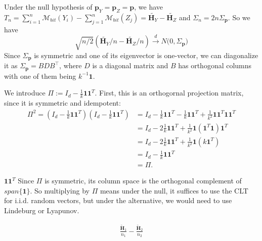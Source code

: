 \documentclass[11pt]{article} %
\begin{document}
Under the null hypothesis of $\boldsymbol{p}_Y = \boldsymbol{p}_Z = \boldsymbol{p}$, 
we have
$T_n = \sum_{i=1}^n\mathcal{M}_{bit}(Y_i) - \sum_{j=1}^n \mathcal{M}_{bit}(Z_j)= \tilde{\boldsymbol{H}_Y} - \tilde{\boldsymbol{H}_Z} $ and 
$\Sigma_n = 2n \Sigma_{\boldsymbol{p}}$.
So we have
\begin{equation}
	\sqrt{n/2}(\tilde{\boldsymbol{H}_Y}/n -\tilde{\boldsymbol{H}_Z}/n)
	\stackrel{d}{\to}
	N
	\bigl(
	0, \Sigma_{\boldsymbol{p}}
	\bigr)
\end{equation}
Since $\Sigma_{\boldsymbol{p}}$ is symmetric and one of its eigenvector is one-vector, we can diagonalize it as  $\Sigma_{\boldsymbol{p}} = BDB^\top$, where $D$ is a diagonal matrix and $B$ has orthogonal columns with one of them being $k^{-1} \boldsymbol{1}$.

We introduce $\Pi := I_d - \frac{1}{k}\boldsymbol{1} \boldsymbol{1}^T$.
First, this is an orthogornal projection matrix, since it is symmetric and idempotent:
\begin{align*}
\Pi^2 =
\left(
I_d - \frac{1}{k}\boldsymbol{1} \boldsymbol{1}^T
\right)
\left(
I_d - \frac{1}{k}\boldsymbol{1} \boldsymbol{1}^T
\right)
&=
I_d -  \frac{1}{k}\boldsymbol{1} \boldsymbol{1}^T
 -  \frac{1}{k}\boldsymbol{1} \boldsymbol{1}^T
 +
 \frac{1}{k^2}\boldsymbol{1} \boldsymbol{1}^T\boldsymbol{1} \boldsymbol{1}^T
\\&=
I_d -  2\frac{1}{k}\boldsymbol{1} \boldsymbol{1}^T
+
\frac{1}{k^2}\boldsymbol{1} (\boldsymbol{1}^T\boldsymbol{1}) \boldsymbol{1}^T
\\&=
I_d -  2\frac{1}{k}\boldsymbol{1} \boldsymbol{1}^T
+
\frac{1}{k^2}\boldsymbol{1} (k \boldsymbol{1}^T)
\\&=
I_d -  \frac{1}{k}\boldsymbol{1} \boldsymbol{1}^T
\\&= \Pi.
\end{align*}

$\boldsymbol{1} \boldsymbol{1}^T$
Since $\Pi$ is symmetric, its column space is the orthogonal complement of $span\{\boldsymbol{1}\}$.
So multiplying by $\Pi$ means 
under the null, it suffices to use the CLT for i.i.d. random vectors, but under the alternative, we would need to use Lindeburg or Lyapunov.










\begin{align*}
	\frac{\tilde{\boldsymbol{H}}_1}{n_1} - \frac{\tilde{\boldsymbol{H}}_2}{n_2}
\end{align*}



\end{document}
